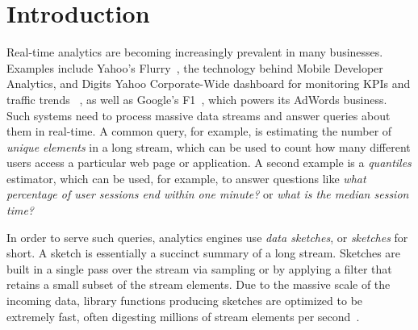 
\section{Introduction}


Real-time analytics are becoming increasingly prevalent in many businesses. 
Examples include Yahoo's Flurry~\cite{flurry},  
the technology behind Mobile Developer Analytics, and Digits Yahoo Corporate-Wide dashboard for monitoring KPIs and traffic trends%
~\cite{digits},
as well as Google's F1~\cite{Shute2013}, which powers its AdWords
business.
Such systems need to process massive data streams and answer queries about them in real-time.
A common query, for example, is estimating the number of \emph{unique elements} in a long stream, which 
can be used to count how many different users access a particular web page or application. 
A second example is a \emph{quantiles} estimator, which can be used, for example, to  answer questions like  \emph{what percentage of user sessions end within one minute?} or \emph{what is the median session time?}

In order to serve such queries, analytics engines use 
\emph{data sketches}, or \emph{sketches} for short. A sketch is essentially 
a succinct summary of a long stream. 
Sketches are built in a single pass over the stream via sampling or by applying a filter 
that retains a small subset  of the stream elements. 
Due to the massive scale of the incoming data,   library functions producing sketches
are optimized to be extremely fast, often digesting millions of stream elements per second~\cite{sketchesLibrary}. 


